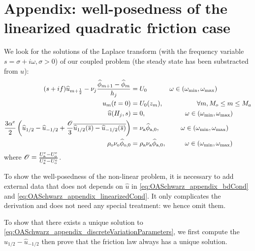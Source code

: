 \section{Appendix: well-posedness of the linearized quadratic friction case}
\label{sec:OASchwarz_appendix_discreteVariationParameters}
We look for the solutions of the Laplace transform
(with the frequency variable $s=\sigma + i\omega, \sigma>0$) of our
coupled problem (the steady state has been substracted from $u$):
\begin{subequations}
	\label{eq:OASchwarz_appendix_discreteVariationParameters}
	\begin{align}
	(s + if) \widehat{u}_{m+\frac{1}{2}} -
		\nu_j \frac{\widehat{\phi}_{m+1} -
		\widehat{\phi}_m}{h_j}
		&=U_0
	\hspace{1.2cm} \omega \in
	(\omega_{\min},\omega_{\max})
		\label{eq:OASchwarz_appendix_eqFourier}\\
		u_m(t=0) &= U_0(z_m),   \hspace{1.8cm}
		\forall m, M_o \leq m \leq M_a \\
		\widehat{u}(H_j, s) &= 0,
		\hspace{2.1cm}
		\omega \in (\omega_{\min},\omega_{\max})
		\label{eq:OASchwarz_appendix_bdCond}\\
		\frac{3\alpha^e}{2} 
		\left( \widehat{u}_{1/2} - \widehat{u}_{-1/2}
		+ \frac{{\cal O}}{3} \overline{
			\widehat{u}_{1/2}(\overline{s}) -
		\widehat{u}_{-1/2}(\overline{s})} \right) &=
		\nu_{\rm a}\widehat{\phi}_{\rm a, 0},
		\hspace{1.12cm}
		\omega \in (\omega_{\min},\omega_{\max})
		\label{eq:OASchwarz_appendix_linearizedCond}
		\\
		\rho_{\rm o} \nu_{\rm o}\widehat{\phi}_{\rm o, 0}
		&= \rho_{\rm a} \nu_{\rm a}\widehat{\phi}_{\rm a, 0},
		\hspace{1.0cm}
		\omega \in (\omega_{\min},\omega_{\max})
		\label{eq:OASchwarz_appendix_continuityFlux}
		\end{align}
		\end{subequations}
where ${\cal O} = \frac{U_{\rm a}^e - U_{\rm o}^e}{\overline{U_{\rm a}^e
	- U_{\rm o}^e}}$.
\begin{remark}
	To show the well-posedness of the non-linear
	problem, it is necessary to add external data
	that does not depends on $\widehat{u}$
	in \eqref{eq:OASchwarz_appendix_bdCond} and
	\eqref{eq:OASchwarz_appendix_linearizedCond}.
	It only complicates the derivation and does not need
	any special treatment: we hence omit them.
\end{remark}
To show that there exists a unique solution to
\eqref{eq:OASchwarz_appendix_discreteVariationParameters},
we first compute the $\widehat{u}_{1/2} - \widehat{u}_{-1/2}$
then prove that the friction law always has a unique solution.
